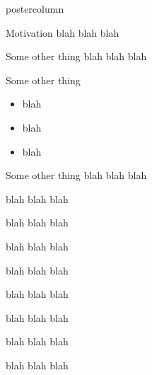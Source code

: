 \documentclass[final]{beamer}
\begin{document}
\begin{frame}
\begin{columns}
\begin{column}{.33\textwidth}
\begin{beamercolorbox}[center,wd=\textwidth]{postercolumn}
\begin{minipage}[T]{.95\textwidth}
{            \begin{block}{Motivation}
              blah blah blah
            \end{block}
            \vfill
            \begin{block}{Some other thing}
              blah blah blah
            \end{block}
            \vfill
            \begin{block}{Some other thing}
              \begin{itemize}
              \item blah
              \item blah
              \item blah
              \end{itemize}              
            \end{block}
            \vfill
            \begin{block}{Some other thing}
              blah blah blah

              blah blah blah

              blah blah blah

              blah blah blah

              blah blah blah

              blah blah blah

              blah blah blah

              blah blah blah

              blah blah blah
            \end{block}
          }
        \end{minipage}
      \end{beamercolorbox}
    \end{column}


  \end{columns}
\end{frame}
\end{document}
